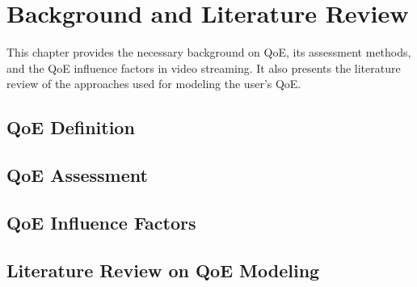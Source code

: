 \chapter{Background and Literature Review}
\label{ch:Background}


\renewcommand{\SectionsDir}{Chapter2/Sections}
\renewcommand{\FigsDir}{Chapter2/Figs}
\renewcommand{\TablesDir}{Chapter2/Tables}


This chapter provides the necessary background on QoE, its assessment methods, and the QoE influence factors in video streaming.
It also presents the literature review of the approaches used for modeling the user's QoE.


\section{QoE Definition}


\section{QoE Assessment}


\section{QoE Influence Factors}


\section{Literature Review on QoE Modeling}

